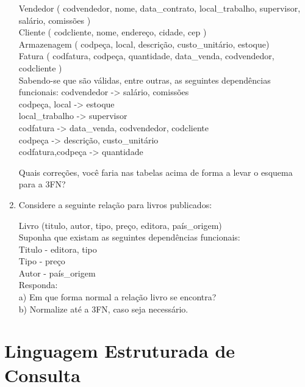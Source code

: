 \documentclass[11pt]{article}
\begin{document}
\begin{enumerate}
	Vendedor ( codvendedor, nome, data\_contrato, local\_trabalho, supervisor, salário, comissões )\\
	Cliente ( codcliente, nome, endereço, cidade, cep )\\
	Armazenagem ( codpeça, local, descrição, custo\_unitário, estoque)\\
	Fatura ( codfatura, codpeça, quantidade, data\_venda, codvendedor, codcliente )\\
	 
	Sabendo-se que são válidas, entre outras, as seguintes dependências funcionais:
	codvendedor -> salário, comissões\\
	codpeça, local -> estoque\\
	local\_trabalho -> supervisor\\
	codfatura -> data\_venda, codvendedor, codcliente\\
	codpeça -> descrição, custo\_unitário\\
	codfatura,codpeça -> quantidade 
	
	Quais correções, você faria nas tabelas acima de forma a levar o esquema para a 3FN?
	
	\item Considere a seguinte relação para livros publicados:
	
	Livro (titulo, autor, tipo, preço, editora, país\_origem)\\
	Suponha que existam as seguintes dependências funcionais:\\
	Titulo - editora, tipo\\
	Tipo - preço\\
	Autor - país\_origem\\
	
	Responda:\\
	a) Em que forma normal a relação livro se encontra?\\
	b) Normalize até a 3FN, caso seja necessário.  
\end{enumerate}

\newpage

\section{Linguagem Estruturada de Consulta}
\end{document}
